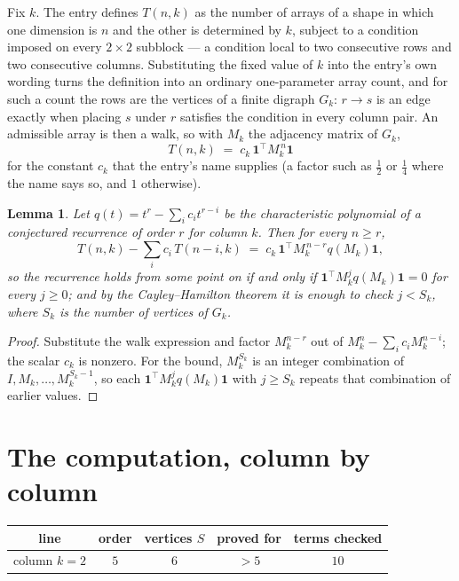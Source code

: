 \documentclass[11pt,a4paper]{article}
\theoremstyle{plain}
\newtheorem{lemma}[theorem]{Lemma}
\theoremstyle{definition}
\begin{document}
Fix $k$. The entry defines $T(n,k)$ as the number of arrays of a shape in which one dimension
is $n$ and the other is determined by $k$, subject to a condition imposed on every
$2\times2$ subblock --- a condition local to two consecutive rows and two consecutive columns.
Substituting the fixed value of $k$ into the entry's own wording turns the definition into an
ordinary one-parameter array count, and for such a count the rows are the vertices of a finite
digraph $G_k$: $r\to s$ is an edge exactly when placing $s$ under $r$ satisfies the condition
in every column pair. An admissible array is then a walk, so with $M_k$ the adjacency matrix
of $G_k$,
\[
T(n,k)\;=\;c_k\,\mathbf{1}^{\!\top}M_k^{\,n}\mathbf{1}
\]
for the constant $c_k$ that the entry's name supplies (a factor such as $\tfrac12$ or
$\tfrac14$ where the name says so, and $1$ otherwise).

\begin{lemma}\label{lem:crit}
Let $q(t)=t^{r}-\sum_i c_it^{r-i}$ be the characteristic polynomial of a conjectured
recurrence of order $r$ for column $k$. Then for every $n\ge r$,
\[
T(n,k)-\sum_i c_i\,T(n-i,k)\;=\;c_k\,\mathbf{1}^{\!\top}M_k^{\,n-r}q(M_k)\mathbf{1},
\]
so the recurrence holds from some point on if and only if
$\mathbf{1}^{\!\top}M_k^{j}q(M_k)\mathbf{1}=0$ for every $j\ge0$; and by the
Cayley--Hamilton theorem it is enough to check $j<S_k$, where $S_k$ is the number of vertices
of $G_k$.
\end{lemma}

\begin{proof}
Substitute the walk expression and factor $M_k^{n-r}$ out of $M_k^{n}-\sum_ic_iM_k^{n-i}$;
the scalar $c_k$ is nonzero. For the bound, $M_k^{S_k}$ is an integer combination of
$I,M_k,\dots,M_k^{S_k-1}$, so each $\mathbf{1}^{\!\top}M_k^{j}q(M_k)\mathbf{1}$ with
$j\ge S_k$ repeats that combination of earlier values.
\end{proof}

\section{The computation, column by column}

\begin{center}
\begin{tabular}{ccccc}
line & order & vertices $S$ & proved for & terms checked \\ \hline
column $k$$=2$ & $5$ & $6$ & $>5$ & $10$ \\
\end{tabular}
\end{center}
\end{document}
